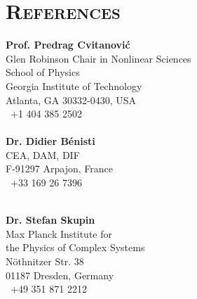 \documentclass[11pt,a4paper,final]{moderncv}
\begin{document}
\section{\textsc{References}}
\begin{minipage}{\textwidth}
\begin{multicols*}{2} %
\textbf{Prof. Predrag Cvitanovi\'c}\vspace{1pt}\\
Glen Robinson Chair in Nonlinear Sciences\\
School of Physics\\
Georgia Institute of Technology\\
Atlanta, GA 30332-0430, USA\\
\phonesymbol\ +1 404 385 2502\\
\\

\textbf{Dr. Didier B\'enisti}\vspace{1pt}\\
CEA, DAM, DIF\\
F-91297 Arpajon, France\\
\phonesymbol\ +33 169 26 7396\\
\\


\columnbreak %
%


\textbf{Dr. Stefan Skupin}\vspace{1pt}\\
Max Planck Institute for\\ the Physics of Complex Systems\\
 N\"{o}thnitzer Str. 38\\
01187 Dresden, Germany\\
\phonesymbol\ +49 351 871 2212\\
\\




\end{multicols*}
\end{minipage}
\end{document}

